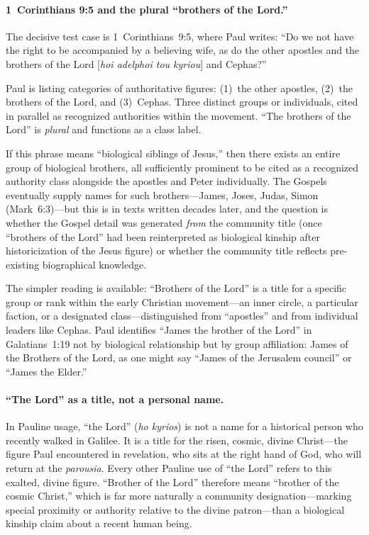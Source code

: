 \documentclass[12pt,oneside]{article}
\newcommand{\grk}[1]{\textit{#1}}   %
\begin{document}
\paragraph{1~Corinthians 9:5 and the plural ``brothers of the Lord.''}
The decisive test case is 1~Corinthians~9:5, where Paul writes: ``Do we
not have the right to be accompanied by a believing wife, as do the
other apostles and the brothers of the Lord [\grk{hoi adelphoi tou
kyriou}] and Cephas?''

Paul is listing categories of authoritative figures: (1)~the other
apostles, (2)~the brothers of the Lord, and (3)~Cephas.  Three distinct
groups or individuals, cited in parallel as recognized authorities
within the movement.  ``The brothers of the Lord'' is \textit{plural}
and functions as a class label.

If this phrase means ``biological siblings of Jesus,'' then there exists
an entire group of biological brothers, all sufficiently prominent to be
cited as a recognized authority class alongside the apostles and Peter
individually.  The Gospels eventually supply names for such
brothers---James, Joses, Judas, Simon (Mark~6:3)---but this is in
texts written decades later, and the question is whether the Gospel
detail was generated \textit{from} the community title (once
``brothers of the Lord'' had been reinterpreted as biological kinship
after historicization of the Jesus figure) or whether the community
title reflects pre-existing biographical knowledge.

The simpler reading is available: ``Brothers of the Lord'' is a title
for a specific group or rank within the early Christian movement---an
inner circle, a particular faction, or a designated class---distinguished
from ``apostles'' and from individual leaders like Cephas.  Paul
identifies ``James the brother of the Lord'' in Galatians~1:19 not by
biological relationship but by group affiliation: James of the Brothers
of the Lord, as one might say ``James of the Jerusalem council'' or
``James the Elder.''

\paragraph{``The Lord'' as a title, not a personal name.}
In Pauline usage, ``the Lord'' (\grk{ho kyrios}) is not a name for a
historical person who recently walked in Galilee.  It is a title for the
risen, cosmic, divine Christ---the figure Paul encountered in
revelation, who sits at the right hand of God, who will return at the
\grk{parousia}.  Every other Pauline use of ``the Lord'' refers to this
exalted, divine figure.  ``Brother of the Lord'' therefore means
``brother of the cosmic Christ,'' which is far more naturally a
community designation---marking special proximity or authority relative
to the divine patron---than a biological kinship claim about a recent
human being.
\end{document}
